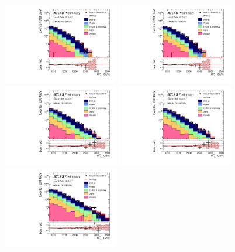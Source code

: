 \begin{figure}[tbph]
\begin{center}
\includegraphics[width=0.45\textwidth]{figures/ATLAS-CONF-2016-078_INT/N-1Plots/AtlasStyle/Preliminary/CRQ_SRJigsawSRG1a_LastCut_CRQ_minusone}
\includegraphics[width=0.45\textwidth]{figures/ATLAS-CONF-2016-078_INT/N-1Plots/AtlasStyle/Preliminary/CRQ_SRJigsawSRG1b_LastCut_CRQ_minusone}
\includegraphics[width=0.45\textwidth]{figures/ATLAS-CONF-2016-078_INT/N-1Plots/AtlasStyle/Preliminary/CRQ_SRJigsawSRG2a_LastCut_CRQ_minusone}
\includegraphics[width=0.45\textwidth]{figures/ATLAS-CONF-2016-078_INT/N-1Plots/AtlasStyle/Preliminary/CRQ_SRJigsawSRG2b_LastCut_CRQ_minusone}
\includegraphics[width=0.45\textwidth]{figures/ATLAS-CONF-2016-078_INT/N-1Plots/AtlasStyle/Preliminary/CRQ_SRJigsawSRG3a_LastCut_CRQ_minusone}

\end{center}
\end{figure}
